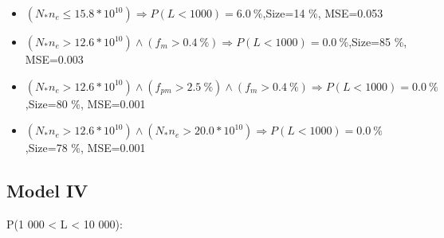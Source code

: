 \documentclass[numbered]{CSL}
\begin{document}
\begin{itemize}
\item $(N_* n_e \leq 15.8 * 10^{10}) \Rightarrow P(L < 1 000) = 6.0~\%$,\hfill Size=14 \%, MSE=0.053
\item $(N_* n_e > 12.6 * 10^{10}) \land (f_m > 0.4~\%) \Rightarrow P(L < 1 000) = 0.0~\%$,\hfill Size=85 \%, MSE=0.003
\item $(N_* n_e > 12.6 * 10^{10}) \land (f_{pm} > 2.5~\%) \land (f_m > 0.4~\%) \Rightarrow P(L < 1 000) = 0.0~\%$,\hfill Size=80 \%, MSE=0.001
\item $(N_* n_e > 12.6 * 10^{10}) \land (N_* n_e > 20.0 * 10^{10}) \Rightarrow P(L < 1 000) = 0.0~\%$,\hfill Size=78 \%, MSE=0.001
\end{itemize}

\subsection{Model IV}
P(1 000 < L < 10 000):
\end{document}
